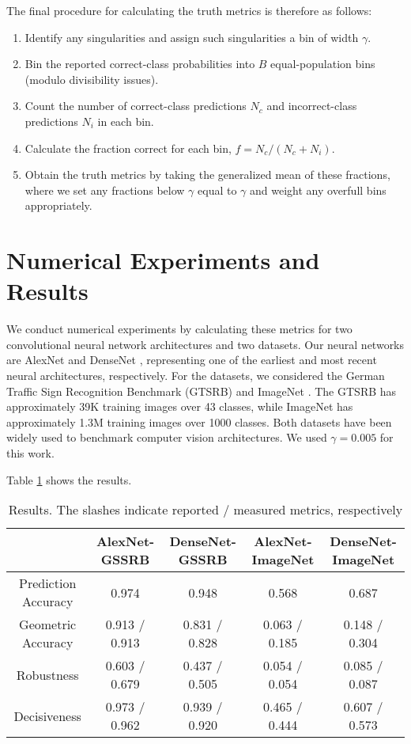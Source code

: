 \documentclass{spie}
\begin{document}
\noindent The final procedure for calculating the truth metrics is therefore as follows:
\begin{enumerate} 
\item Identify any singularities and assign such singularities a bin of width $\gamma$.
\item Bin the reported correct-class probabilities into $B$ equal-population bins (modulo divisibility issues).
\item Count the number of correct-class predictions $N_c$ and incorrect-class predictions $N_i$ in each bin.
\item Calculate the fraction correct for each bin, $f = N_c/(N_c + N_i)$.
\item Obtain the truth metrics by taking the generalized mean of these fractions, where we set any fractions below $\gamma$ equal to $\gamma$ and weight any overfull bins appropriately.
\end{enumerate}

\section{Numerical Experiments and Results}
\label{results}
We conduct numerical experiments by calculating these metrics for two convolutional neural network architectures and two datasets. Our neural networks are AlexNet \cite{AlexNet} and DenseNet \cite{DenseNet}, representing one of the earliest and most recent neural architectures, respectively. For the datasets, we considered the German Traffic Sign Recognition Benchmark (GTSRB) \cite{GTSRB} and ImageNet \cite{ImageNet}. The GTSRB has approximately 39K training images over 43 classes, while ImageNet has approximately 1.3M training images over 1000 classes. Both datasets have been widely used to benchmark computer vision architectures. We used $\gamma = 0.005$ for this work. 

Table \ref{tab:results} shows the results. 

\begin{table}[h]
\centering
\caption{Results. The slashes indicate reported / measured metrics, respectively}
\label{tab:results}
\vspace{0.05in}
\begin{tabular}{|c|c|c|c|c|}
\hline
 & AlexNet-GSSRB & DenseNet-GSSRB & AlexNet-ImageNet & DenseNet-ImageNet \\ 
\hline
Prediction Accuracy & 0.974 & 0.948 & 0.568 & 0.687 \\
\hline
Geometric Accuracy & 0.913 / 0.913 & 0.831 / 0.828 & 0.063 / 0.185 & 0.148 / 0.304 \\
\hline
Robustness & 0.603 / 0.679 & 0.437 / 0.505 & 0.054 / 0.054 & 0.085 / 0.087 \\
\hline
Decisiveness & 0.973 / 0.962 & 0.939 / 0.920 & 0.465 / 0.444 & 0.607 / 0.573 \\
\hline
\end{tabular}
\end{table}
\end{document}
